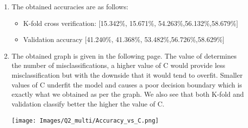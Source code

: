 \documentclass[12pt]{article}
\begin{document}
\begin{enumerate}[label=(\alph*)]
    \item The obtained accuracies are as follows:
    \begin{itemize}
        \item K-fold cross verification: [15.342\%, 15.671\%, 54.263\%,56.132\%,58.679\%]
        \item Validation accuracy [41.240\%, 41.368\%, 53.482\%,56.726\%,58.629\%]
    \end{itemize}
    \item The obtained graph is given in the following page. The value of determines the number of misclassifications, a higher value of C would provide less misclassification but with the downside that it would tend to overfit. Smaller values of C underfit the model and causes a poor decision boundary which is exactly what we obtained as per the graph.
    We also see that both K-fold and validation classify better the higher the value of C.

        \begin{center}
            \texttt{[image: Images/Q2\_multi/Accuracy\_vs\_C.png]}
        \end{center}

\end{enumerate}
\end{document}

